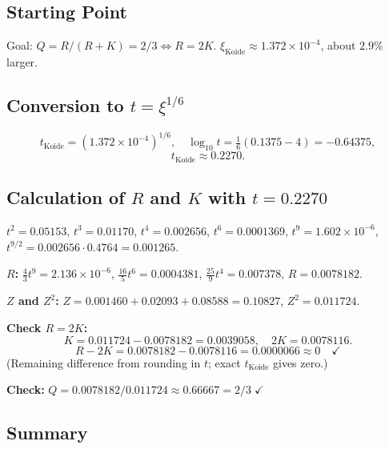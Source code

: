 \subsection{Starting Point}

Goal: $Q=R/(R+K)=2/3 \Leftrightarrow R=2K$.
$\xi_{\text{Koide}}\approx1.372\times10^{-4}$, about $2.9\%$ larger.

\subsection{Conversion to $t=\xi^{1/6}$}

\[
  t_{\text{Koide}}=(1.372\times10^{-4})^{1/6},
  \quad \log_{10}t=\tfrac{1}{6}(0.1375-4)=-0.64375,
\]
\[
  t_{\text{Koide}}\approx0.2270.
\]

\subsection{Calculation of $R$ and $K$ with $t=0.2270$}

$t^2=0.05153$, $t^3=0.01170$, $t^4=0.002656$,
$t^6=0.0001369$, $t^9=1.602\times10^{-6}$,
$t^{9/2}=0.002656\cdot0.4764=0.001265$.

\textbf{$R$:}
$\tfrac{4}{3}t^9=2.136\times10^{-6}$,
$\tfrac{16}{5}t^6=0.0004381$,
$\tfrac{25}{9}t^4=0.007378$,
$R=0.0078182$.

\textbf{$Z$ and $Z^2$:}
$Z=0.001460+0.02093+0.08588=0.10827$, $Z^2=0.011724$.

\textbf{Check $R=2K$:}
\[
  K=0.011724-0.0078182=0.0039058, \quad 2K=0.0078116.
\]
\[
  R-2K=0.0078182-0.0078116=0.0000066\approx0\quad\checkmark
\]
(Remaining difference from rounding in $t$; exact $t_{\text{Koide}}$ gives zero.)

\textbf{Check:} $Q=0.0078182/0.011724\approx0.66667=2/3\;\checkmark$

\subsection{Summary}

\begin{center}
\renewcommand{\arraystretch}{1.4}
\end{center}

